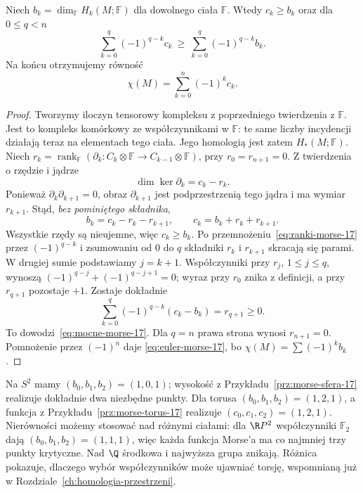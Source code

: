 \begin{twierdzenie}
\label{thm:nierownosci-morse-17}
Niech $b_k=\dim_{\mathbb F}H_k(M;\mathbb F)$
dla dowolnego ciała $\mathbb F$.
Wtedy $c_k\geq b_k$ oraz dla
$0\leq q<n$
\begin{equation}\label{eq:mocne-morse-17}
 \sum_{k=0}^q(-1)^{q-k}c_k
 \ \geq\
 \sum_{k=0}^q(-1)^{q-k}b_k.
\end{equation}
Na końcu otrzymujemy równość
\begin{equation}\label{eq:euler-morse-17}
 \chi(M)=\sum_{k=0}^n(-1)^kc_k.
\end{equation}
\end{twierdzenie}
\begin{proof}
Tworzymy iloczyn tensorowy kompleksu z poprzedniego
twierdzenia z $\mathbb F$.
Jest to kompleks komórkowy ze współczynnikami w $\mathbb F$:
te same liczby incydencji działają teraz na elementach tego ciała.
Jego homologią jest zatem $H_*(M;\mathbb F)$.
Niech $r_k=\operatorname{rank}_{\mathbb F}
(\partial_k:C_k\otimes\mathbb F
\to C_{k-1}\otimes\mathbb F)$,
przy $r_0=r_{n+1}=0$.
Z twierdzenia o rzędzie i jądrze
\[
 \dim\ker\partial_k=c_k-r_k.
\]
Ponieważ $\partial_k\partial_{k+1}=0$,
obraz $\partial_{k+1}$ jest podprzestrzenią
tego jądra i ma wymiar $r_{k+1}$.
Stąd, \emph{bez pominiętego składnika},
\begin{equation}\label{eq:ranki-morse-17}
 b_k=c_k-r_k-r_{k+1},
 \qquad c_k=b_k+r_k+r_{k+1}.
\end{equation}
Wszystkie rzędy są nieujemne,
więc $c_k\geq b_k$.
Po przemnożeniu~\eqref{eq:ranki-morse-17}
przez $(-1)^{q-k}$ i zsumowaniu
od $0$ do $q$ składniki $r_k$
i $r_{k+1}$ skracają się parami.
W drugiej sumie podstawiamy $j=k+1$.
Współczynniki przy $r_j$, $1\leq j\leq q$, wynoszą
$(-1)^{q-j}+(-1)^{q-j+1}=0$;
wyraz przy $r_0$ znika z definicji, a przy $r_{q+1}$ pozostaje $+1$.
Zostaje dokładnie
\[
 \sum_{k=0}^q(-1)^{q-k}(c_k-b_k)
   =r_{q+1}\geq0.
\]
To dowodzi~\eqref{eq:mocne-morse-17}.
Dla $q=n$ prawa strona wynosi
$r_{n+1}=0$. Pomnożenie
przez $(-1)^n$ daje
\eqref{eq:euler-morse-17},
bo $\chi(M)=\sum(-1)^kb_k$.
\end{proof}

\begin{przyklad}
Na $S^2$ mamy $(b_0,b_1,b_2)=(1,0,1)$;
wysokość z Przykładu~\ref{prz:morse-sfera-17}
realizuje dokładnie dwa niezbędne
punkty. Dla torusa
$(b_0,b_1,b_2)=(1,2,1)$,
a funkcja z
Przykładu~\ref{prz:morse-torus-17}
realizuje $(c_0,c_1,c_2)=(1,2,1)$.
Nierówności możemy stosować
nad różnymi ciałami: dla
$\R P^2$ współczynniki
$\mathbb F_2$ dają
$(b_0,b_1,b_2)=(1,1,1)$,
więc każda funkcja Morse'a
ma co najmniej trzy punkty
krytyczne. Nad $\Q$ środkowa
i najwyższa grupa znikają.
Różnica pokazuje, dlaczego
wybór współczynników może
ujawniać torsję, wspomnianą
już w
Rozdziale~\ref{ch:homologia-przestrzeni}.
\end{przyklad}

